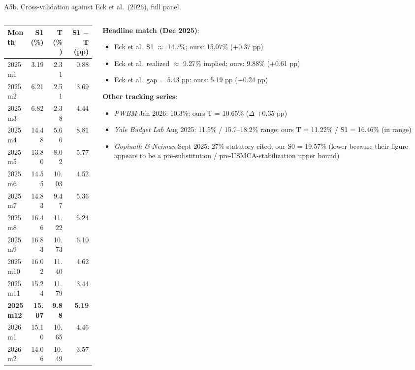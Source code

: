 \documentclass[aspectratio=169,10pt]{beamer}
\begin{document}
\begin{frame}{A5b. Cross-validation against Eck et al.\ (2026), full panel}
\hypertarget{appendix_eck}{}

\scriptsize

\begin{columns}[T]
\begin{column}{0.55\textwidth}

\begin{tabular}{l r r r}
\toprule
Month & S1 (\%) & T (\%) & S1 $-$ T (pp) \\
\midrule
2025m1 & 3.19 & 2.31 & 0.88 \\
2025m2 & 6.21 & 2.51 & 3.69 \\
2025m3 & 6.82 & 2.38 & 4.44 \\
2025m4 & 14.48 & 5.66 & 8.81 \\
2025m5 & 13.80 & 8.02 & 5.77 \\
2025m6 & 14.55 & 10.03 & 4.52 \\
2025m7 & 14.83 & 9.47 & 5.36 \\
2025m8 & 16.46 & 11.22 & 5.24 \\
2025m9 & 16.83 & 10.73 & 6.10 \\
2025m10 & 16.02 & 11.40 & 4.62 \\
2025m11 & 15.24 & 11.79 & 3.44 \\
\textbf{2025m12} & \textbf{15.07} & \textbf{9.88} & \textbf{5.19} \\
2026m1 & 15.10 & 10.65 & 4.46 \\
2026m2 & 14.06 & 10.49 & 3.57 \\
\bottomrule
\end{tabular}

\end{column}
\begin{column}{0.45\textwidth}

\textbf{Headline match (Dec 2025)}:

\begin{itemize}\scriptsize
  \item Eck et al.\ S1 $\approx$ 14.7\%; ours: 15.07\% (+0.37 pp)
  \item Eck et al.\ realized $\approx$ 9.27\% implied; ours: 9.88\% (+0.61 pp)
  \item Eck et al.\ gap = 5.43 pp; ours: 5.19 pp ($-$0.24 pp)
\end{itemize}

\medskip

\textbf{Other tracking series}:
\begin{itemize}\scriptsize
  \item \emph{PWBM} Jan 2026: 10.3\%; ours T = 10.65\% ($\Delta$ +0.35 pp)
  \item \emph{Yale Budget Lab} Aug 2025: 11.5\% / 15.7--18.2\% range; ours T = 11.22\% / S1 = 16.46\% (in range)
  \item \emph{Gopinath \& Neiman} Sept 2025: 27\% statutory cited; our S0 = 19.57\% (lower because their figure appears to be a pre-substitution / pre-USMCA-stabilization upper bound)
\end{itemize}


\end{column}
\end{columns}
\end{frame}
\end{document}
